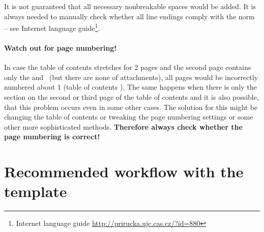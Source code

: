 It is not guaranteed that all necessary nonbreakable spaces would be added. It is always needed to manually check whether all line endings comply with the norm -- see Internet language guide\footnote{Internet language guide \url{http://prirucka.ujc.cas.cz/?id=880}}.

\paragraph {Watch out for page numbering!} In case the table of contents stretches for 2 pages and the second page contains only the  and~ (but there are none of attachments), all pages would be incorrectly numbered about 1 (table of contents ). The same happens when there is only the  section on the second or third page of the table of contents and it is also possible, that this problem occurs even in some other cases. The solution for this might be changing the table of contents or tweaking the page numbering settings or some other more sophisticated methods. \textbf{Therefore always check whether the page numbering is correct!}


\section*{Recommended workflow with the template}

